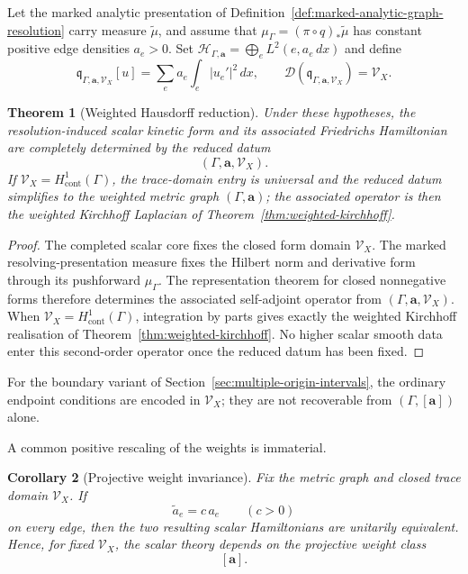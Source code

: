 \documentclass[11pt]{article}
\theoremstyle{plain}
\newtheorem{theorem}{Theorem}[section]
\newtheorem{corollary}[theorem]{Corollary}
\theoremstyle{definition}
\begin{document}
Let the marked analytic presentation of
Definition~\ref{def:marked-analytic-graph-resolution} carry measure
\(\widetilde\mu\), and assume that \(\mu_\Gamma=(\pi\circ q)_*\widetilde\mu\) has constant positive edge densities \(a_e>0\). Set \(\mathcal H_{\Gamma,\mathbf a} = \bigoplus_e L^2(e,a_e\,dx)\) and define
\[
  \mathfrak q_{\Gamma,\mathbf a,\mathcal V_X}[u]
  =
  \sum_e a_e\int_e|u_e'|^2\,dx,
  \qquad
  \mathcal D(\mathfrak q_{\Gamma,\mathbf a,\mathcal V_X})=\mathcal V_X.
\]

\begin{theorem}[Weighted Hausdorff reduction]
\label{thm:weighted-Hausdorff-reduction}
Under these hypotheses, the resolution-induced scalar kinetic form and its
associated Friedrichs Hamiltonian are completely determined by the reduced
datum
\[
  (\Gamma,\mathbf a,\mathcal V_X).
\]
If \(\mathcal V_X=H^1_{\mathrm{cont}}(\Gamma)\), the trace-domain entry is
universal and the reduced datum simplifies to the weighted metric graph
\((\Gamma,\mathbf a)\); the associated operator is then the weighted
Kirchhoff Laplacian of Theorem~\ref{thm:weighted-kirchhoff}.
\end{theorem}

\begin{proof}
The completed scalar core fixes the closed form domain \(\mathcal V_X\). The
marked resolving-presentation measure fixes the Hilbert norm and derivative
form through its pushforward \(\mu_\Gamma\). The representation theorem for
closed nonnegative forms therefore determines the associated self-adjoint
operator from \((\Gamma,\mathbf a,\mathcal V_X)\). When
\(\mathcal V_X=H^1_{\mathrm{cont}}(\Gamma)\), integration by parts gives
exactly the weighted Kirchhoff realisation of
Theorem~\ref{thm:weighted-kirchhoff}. No higher scalar smooth data enter this
second-order operator once the reduced datum has been fixed.
\end{proof}

For the boundary variant of Section~\ref{sec:multiple-origin-intervals}, the
ordinary endpoint conditions are encoded in \(\mathcal V_X\); they are not
recoverable from \((\Gamma,[\mathbf a])\) alone.

A common positive rescaling of the weights is immaterial.

\begin{corollary}[Projective weight invariance]
\label{cor:weighted-common-rescaling}
Fix the metric graph and closed trace domain \(\mathcal V_X\). If
\[
  \widetilde a_e=c\,a_e
  \qquad
  (c>0)
\]
on every edge, then the two resulting scalar Hamiltonians are unitarily
equivalent. Hence, for fixed \(\mathcal V_X\), the scalar theory depends on
the projective weight class
\[
  [\mathbf a].
\]
\end{corollary}
\end{document}
